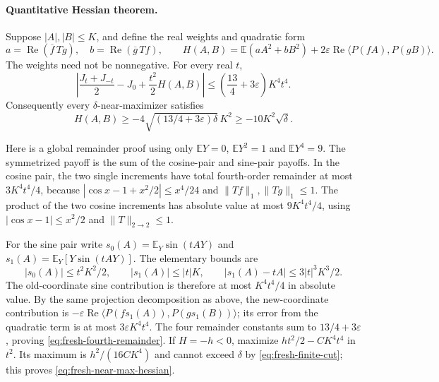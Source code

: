 \paragraph{Quantitative Hessian theorem.}
Suppose $|A|,|B|\le K$, and define the real weights and quadratic form
\[
 a=\operatorname{Re}(\overline f\,Tg),\quad
 b=\operatorname{Re}(\overline g\,Tf),\qquad
 H(A,B)=\mathbb E(aA^2+bB^2)
       +2\varepsilon\operatorname{Re}\langle P(fA),P(gB)\rangle.
\]
The weights need not be nonnegative. For every real $t$,
\begin{equation}\label{eq:fresh-fourth-remainder}
 \left|\frac{J_t+J_{-t}}2-J_0+\frac{t^2}2H(A,B)\right|
 \le\left(\frac{13}4+3\varepsilon\right)K^4t^4.
\end{equation}
Consequently every $\delta$-near-maximizer satisfies
\begin{equation}\label{eq:fresh-near-max-hessian}
 \boxed{H(A,B)\ge-4\sqrt{(13/4+3\varepsilon)\delta}\,K^2
                    \ge-10K^2\sqrt\delta.}
\end{equation}

Here is a global remainder proof using only
$\mathbb EY=0$, $\mathbb EY^2=1$ and $\mathbb EY^4=9$.
The symmetrized payoff is the sum of the cosine-pair and sine-pair
payoffs. In the cosine pair, the two single increments have total
fourth-order remainder at most $3K^4t^4/4$, because
$|\cos x-1+x^2/2|\le x^4/24$ and
$\|Tf\|_1,\|Tg\|_1\le1$. The product of the two cosine increments
has absolute value at most $9K^4t^4/4$, using
$|\cos x-1|\le x^2/2$ and $\|T\|_{2\to2}\le1$.

For the sine pair write
$s_0(A)=\mathbb E_Y\sin(tAY)$ and
$s_1(A)=\mathbb E_Y[Y\sin(tAY)]$. The elementary bounds are
\[
 |s_0(A)|\le t^2K^2/2,\qquad |s_1(A)|\le |t|K,
 \qquad |s_1(A)-tA|\le3|t|^3K^3/2.
\]
The old-coordinate sine contribution is therefore at most
$K^4t^4/4$ in absolute value. By the same projection decomposition as
above, the new-coordinate contribution is
$-\varepsilon\operatorname{Re}\langle P(fs_1(A)),P(gs_1(B))\rangle$;
its error from the quadratic term is at most
$3\varepsilon K^4t^4$. The four remainder constants sum to
$13/4+3\varepsilon$, proving \eqref{eq:fresh-fourth-remainder}.
If $H=-h<0$, maximize $ht^2/2-CK^4t^4$ in $t^2$. Its maximum is
$h^2/(16CK^4)$ and cannot exceed $\delta$ by
\eqref{eq:fresh-finite-cut}; this proves
\eqref{eq:fresh-near-max-hessian}.

